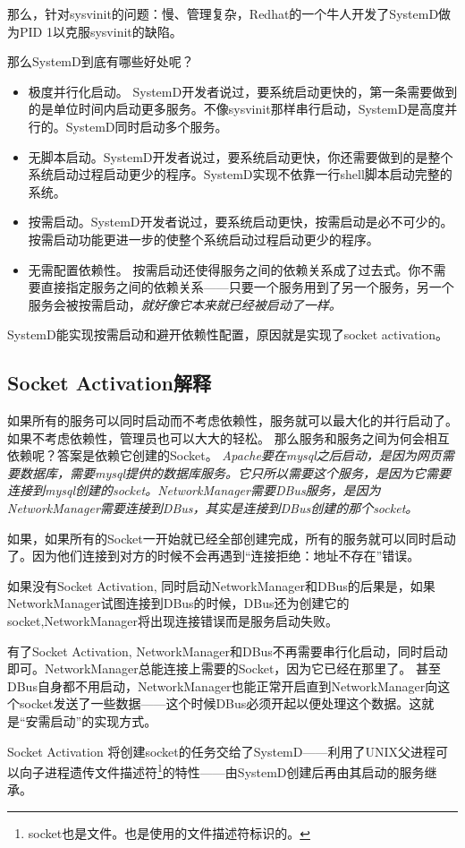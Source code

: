 \documentclass[amstex,twoside]{ctexbook}
\newenvironment{insertnote}{ \ttfamily\CJKfamily{KaiTi} }{\vskip 0.5cm }
\begin{document}
那么，针对sysvinit的问题：慢、管理复杂，Redhat的一个牛人开发了SystemD做为PID 1以克服sysvinit的缺陷。

那么SystemD到底有哪些好处呢？

\begin{itemize}
\item 极度并行化启动。
		SystemD开发者说过，要系统启动更快的，第一条需要做到的是单位时间内启动更多服务。不像sysvinit那样串行启动，SystemD是高度并行的。SystemD同时启动多个服务。

\item 无脚本启动。SystemD开发者说过，要系统启动更快，你还需要做到的是整个系统启动过程启动更少的程序。SystemD实现不依靠一行shell脚本启动完整的系统。

\item	按需启动。SystemD开发者说过，要系统启动更快，按需启动是必不可少的。按需启动功能更进一步的使整个系统启动过程启动更少的程序。

\item	无需配置依赖性。
		按需启动还使得服务之间的依赖关系成了过去式。你不需要直接指定服务之间的依赖关系——只要一个服务用到了另一个服务，另一个服务会被按需启动，\em 就好像它本来就已经被启动了一样。

\end{itemize}

SystemD能实现按需启动和避开依赖性配置，原因就是实现了socket activation。

\begin{insertnote}
\subsection*{Socket Activation解释}
如果所有的服务可以同时启动而不考虑依赖性，服务就可以最大化的并行启动了。如果不考虑依赖性，管理员也可以大大的轻松。
那么服务和服务之间为何会相互依赖呢？答案是依赖它创建的Socket。{ \it Apache要在mysql之后启动，是因为网页需要数据库，需要mysql提供的数据库服务。它只所以需要这个服务，是因为它需要连接到mysql创建的socket。NetworkManager需要DBus服务，是因为NetworkManager需要连接到DBus，其实是连接到DBus创建的那个socket。}

如果，如果所有的Socket一开始就已经全部创建完成，所有的服务就可以同时启动了。因为他们连接到对方的时候不会再遇到“连接拒绝：地址不存在”错误。

如果没有Socket Activation, 同时启动NetworkManager和DBus的后果是，如果NetworkManager试图连接到DBus的时候，DBus还为创建它的socket,NetworkManager将出现连接错误而是服务启动失败。

有了Socket Activation, NetworkManager和DBus不再需要串行化启动，同时启动即可。NetworkManager总能连接上需要的Socket，因为它已经在那里了。
甚至DBus自身都不用启动，NetworkManager也能正常开启直到NetworkManager向这个socket发送了一些数据——这个时候DBus必须开起以便处理这个数据。这就是“安需启动”的实现方式。

Socket Activation 将创建socket的任务交给了SystemD——利用了UNIX父进程可以向子进程遗传文件描述符\footnote{socket也是文件。也是使用的文件描述符标识的。}的特性——由SystemD创建后再由其启动的服务继承。
\end{insertnote}
\end{document}
